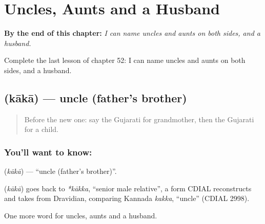 
\chapter{Uncles, Aunts and a Husband}
\label{ch:gu-uncles-aunts-and-a-husband}

\begin{chapteropening}
\textbf{By the end of this chapter:} \emph{I can name uncles and aunts on both sides, and a husband.}

Complete the last lesson of chapter 52: I can name uncles and aunts on both sides, and a husband.
\end{chapteropening}

\section[\texorpdfstring{\gu{કાકા} (kākā)}{કાકા (kākā)}]{ (kākā) — uncle (father's brother)}

\label{lesson:GU-C52-kaka}



\begin{quote}
Before the new one: say the Gujarati for grandmother, then the Gujarati for a child.
\end{quote}

\subsection*{You'll want to know: }
\textbf{} (\emph{kākā}) — \textquotedblleft{}uncle (father's brother)\textquotedblright{}.

\begin{cousinweb}
\textbf{} (\emph{kākā}) goes back to \emph{*kākka}, \textquotedblleft{}senior male relative\textquotedblright{}, a form CDIAL reconstructs and takes from Dravidian, comparing Kannada \emph{kakka}, \textquotedblleft{}uncle\textquotedblright{} (CDIAL 2998).
\end{cousinweb}

\begin{grammarlens}[title={What you've built}]
One more word for uncles, aunts and a husband.
\end{grammarlens}

